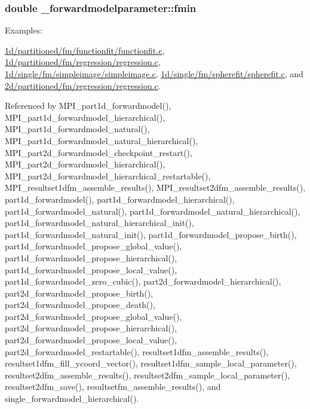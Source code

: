 \subsubsection[{\texorpdfstring{fmin}{fmin}}]{\setlength{\rightskip}{0pt plus 5cm}double \+\_\+forwardmodelparameter\+::fmin}\hypertarget{struct__forwardmodelparameter_aced3d685a9701e3488ac78093a4e4733}{}\label{struct__forwardmodelparameter_aced3d685a9701e3488ac78093a4e4733}
\begin{Desc}
\item[Examples\+: ]\par
\hyperlink{1d_2partitioned_2fm_2functionfit_2functionfit_8c-example}{1d/partitioned/fm/functionfit/functionfit.\+c}, \hyperlink{1d_2partitioned_2fm_2regression_2regression_8c-example}{1d/partitioned/fm/regression/regression.\+c}, \hyperlink{1d_2single_2fm_2simpleimage_2simpleimage_8c-example}{1d/single/fm/simpleimage/simpleimage.\+c}, \hyperlink{1d_2single_2fm_2spherefit_2spherefit_8c-example}{1d/single/fm/spherefit/spherefit.\+c}, and \hyperlink{2d_2partitioned_2fm_2regression_2regression_8c-example}{2d/partitioned/fm/regression/regression.\+c}.\end{Desc}


Referenced by M\+P\+I\+\_\+part1d\+\_\+forwardmodel(), M\+P\+I\+\_\+part1d\+\_\+forwardmodel\+\_\+hierarchical(), M\+P\+I\+\_\+part1d\+\_\+forwardmodel\+\_\+natural(), M\+P\+I\+\_\+part1d\+\_\+forwardmodel\+\_\+natural\+\_\+hierarchical(), M\+P\+I\+\_\+part2d\+\_\+forwardmodel\+\_\+checkpoint\+\_\+restart(), M\+P\+I\+\_\+part2d\+\_\+forwardmodel\+\_\+hierarchical(), M\+P\+I\+\_\+part2d\+\_\+forwardmodel\+\_\+hierarchical\+\_\+restartable(), M\+P\+I\+\_\+resultset1dfm\+\_\+assemble\+\_\+results(), M\+P\+I\+\_\+resultset2dfm\+\_\+assemble\+\_\+results(), part1d\+\_\+forwardmodel(), part1d\+\_\+forwardmodel\+\_\+hierarchical(), part1d\+\_\+forwardmodel\+\_\+natural(), part1d\+\_\+forwardmodel\+\_\+natural\+\_\+hierarchical(), part1d\+\_\+forwardmodel\+\_\+natural\+\_\+hierarchical\+\_\+init(), part1d\+\_\+forwardmodel\+\_\+natural\+\_\+init(), part1d\+\_\+forwardmodel\+\_\+propose\+\_\+birth(), part1d\+\_\+forwardmodel\+\_\+propose\+\_\+global\+\_\+value(), part1d\+\_\+forwardmodel\+\_\+propose\+\_\+hierarchical(), part1d\+\_\+forwardmodel\+\_\+propose\+\_\+local\+\_\+value(), part1d\+\_\+forwardmodel\+\_\+zero\+\_\+cubic(), part2d\+\_\+forwardmodel\+\_\+hierarchical(), part2d\+\_\+forwardmodel\+\_\+propose\+\_\+birth(), part2d\+\_\+forwardmodel\+\_\+propose\+\_\+death(), part2d\+\_\+forwardmodel\+\_\+propose\+\_\+global\+\_\+value(), part2d\+\_\+forwardmodel\+\_\+propose\+\_\+hierarchical(), part2d\+\_\+forwardmodel\+\_\+propose\+\_\+local\+\_\+value(), part2d\+\_\+forwardmodel\+\_\+restartable(), resultset1dfm\+\_\+assemble\+\_\+results(), resultset1dfm\+\_\+fill\+\_\+ycoord\+\_\+vector(), resultset1dfm\+\_\+sample\+\_\+local\+\_\+parameter(), resultset2dfm\+\_\+assemble\+\_\+results(), resultset2dfm\+\_\+sample\+\_\+local\+\_\+parameter(), resultset2dfm\+\_\+save(), resultsetfm\+\_\+assemble\+\_\+results(), and single\+\_\+forwardmodel\+\_\+hierarchical().

